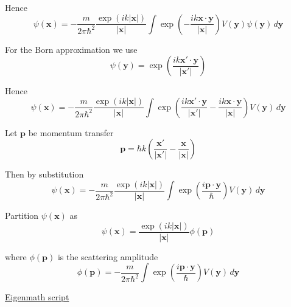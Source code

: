 Hence
\begin{equation*}
\psi(\mathbf x)=-\frac{m}{2\pi\hbar^2}\frac{\exp(ik|\mathbf x|)}{|\mathbf x|}
\int\exp\left(-\frac{ik\mathbf x\cdot\mathbf y}{|\mathbf x|}\right)
V(\mathbf y)\psi(\mathbf y)\,d\mathbf y
\end{equation*}

For the Born approximation we use
\begin{equation*}
\psi(\mathbf y)=\exp\left(\frac{ik\mathbf x'\cdot\mathbf y}{|\mathbf x'|}\right)
\end{equation*}

Hence
\begin{equation*}
\psi(\mathbf x)=-\frac{m}{2\pi\hbar^2}\frac{\exp(ik|\mathbf x|)}{|\mathbf x|}
\int\exp\left(\frac{ik\mathbf x'\cdot\mathbf y}{|\mathbf x'|}
-\frac{ik\mathbf x\cdot\mathbf y}{|\mathbf x|}\right)
V(\mathbf y)\,d\mathbf y
\end{equation*}

Let $\mathbf p$ be momentum transfer
\begin{equation*}
\mathbf p=\hbar k\left(\frac{\mathbf x'}{|\mathbf x'|}-\frac{\mathbf x}{|\mathbf x|}\right)
\end{equation*}

Then by substitution
\begin{equation*}
\psi(\mathbf x)=-\frac{m}{2\pi\hbar^2}\frac{\exp(ik|\mathbf x|)}{|\mathbf x|}
\int\exp\left(\frac{i\mathbf p\cdot\mathbf y}{\hbar}\right)
V(\mathbf y)\,d\mathbf y
\end{equation*}

Partition $\psi(\mathbf x)$ as
\begin{equation*}
\psi(\mathbf x)=\frac{\exp(ik|\mathbf x|)}{|\mathbf x|}\phi(\mathbf p)
\end{equation*}

where $\phi(\mathbf p)$ is the scattering amplitude
\begin{equation*}
\phi(\mathbf p)=-\frac{m}{2\pi\hbar^2}
\int\exp\left(\frac{i\mathbf p\cdot\mathbf y}{\hbar}\right)
V(\mathbf y)\,d\mathbf y
\end{equation*}

\href{https://georgeweigt.github.io/examples/born-approximation-demo.html}{Eigenmath script}


